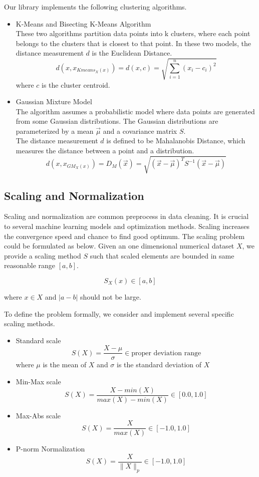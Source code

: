 \documentclass[sigconf]{acmart}
\begin{document}
Our library implements the following clustering algorithms. 
\begin{itemize}
	\item{K-Means and Bisecting K-Means Algorithm} \\
		These two algorithms partition data points into k clusters, where each point belongs to the clusters that is closest to that point. In these two models, the distance measurement $d$ is the Euclidean Distance.
		\[ d( x, x_{Kmeans_X(x)}) = d( x, c) = \sqrt{\sum_{i=1}^n{(x_i - c_i ) ^ 2} } \]
		where $c$ is the cluster centroid.
	\item{Gaussian Mixture Model} \\
		The algorithm assumes a probabilistic model where data points are generated from some Gaussian distributions. The Gaussian distributions are parameterized by a mean $\vec{\mu}$ and a covariance matrix $S$. \\
		The distance measurement $d$ is defined to be Mahalanobis Distance, which measures the distance between a point and a distribution.
		\[ d( x, x_{GM_X(x)}) = D_M(\vec{x}) = \sqrt{(\vec{x}-\vec{\mu})^T S^{-1} (\vec{x}-\vec{\mu}) } \]
\end{itemize}

\subsection{Scaling and Normalization}
Scaling and normalization are common preprocess in data cleaning. It is crucial to several machine learning models and optimization methods. Scaling increases the convergence speed and chance to find good optimum\cite{convex}. The scaling problem could be formulated as below.
Given an one dimensional numerical dataset $X$, we provide a scaling method $S$ such that scaled elements are bounded in same reasonable range $[a, b]$.

\[ S_X(x) \in [a, b]\] 

where $x \in X$ and $|a - b|$ should not be large.

To define the problem formally, we consider and implement several specific scaling methods.
\begin{itemize}
	\item{Standard scale}
		\[ S(X) = \dfrac{X-\mu}{\sigma} \in \text{proper deviation range}\]
		where $\mu$ is the mean of $X$ and $\sigma$ is the standard deviation of $X$
	\item{Min-Max scale}
		\[ S(X) = \dfrac{X-min(X)}{max(X) - min(X)}\in [0.0, 1.0] \]
	\item{Max-Abs scale}
		\[ S(X) = \dfrac{X}{max(X)} \in [-1.0, 1.0] \]
	\item{P-norm Normalization}
		\[ S(X) = \dfrac{X}{\|X\|_{p}} \in [-1.0, 1.0]\]
\end{itemize}
\end{document}

